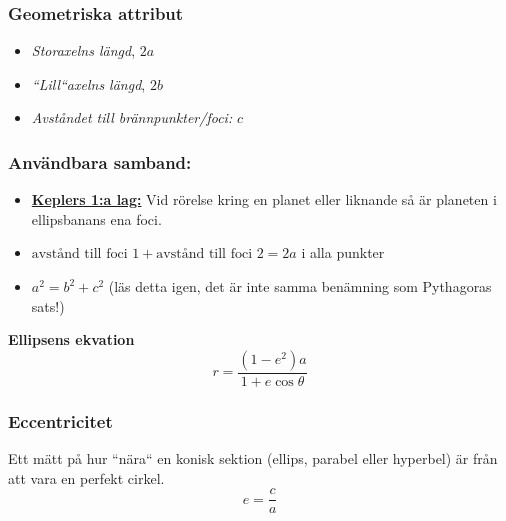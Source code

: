 \documentclass{article}
\newenvironment{ankiflashcard}[1]{}{}
\begin{document}
\begin{paracol}{2}
\begin{ankiflashcard}{Hur benämns de olika sträckorna i ellipsen}
    
\subsubsection{Geometriska attribut}
\begin{itemize}
    \item \textit{Storaxelns längd}, $2a$
    \item  \textit{``Lill``axelns längd}, $2b$
    \item \textit{Avståndet till brännpunkter/foci:} $c$
\end{itemize}
\end{ankiflashcard}


\begin{ankiflashcard}{Ställ upp användbara samband kring ellipsens geometri.}
\subsubsection{Användbara samband:}
\begin{itemize}
    \item \underline{\textbf{Keplers 1:a lag:}} Vid rörelse kring en planet eller liknande så är planeten i ellipsbanans ena foci.
    \item $\text{avstånd till foci 1}+\text{avstånd till foci 2} = 2a$ i alla punkter
    \item $a^2=b^2+c^2$ (läs detta igen, det är inte samma benämning som Pythagoras sats!)
\end{itemize}
\end{ankiflashcard}

\begin{ankiflashcard}{Ställ upp ellipsens ekvation (som funktion av vinkeln)}
\textbf{Ellipsens ekvation}
$$
r=\frac{(1-e^2)a}{1+e\cos \theta}
$$
\end{ankiflashcard}

\begin{ankiflashcard}{Formulera eccentricitet.}
    
\subsubsection{Eccentricitet}
Ett mätt på hur ``nära`` en konisk sektion (ellips, parabel eller hyperbel) är från att vara en perfekt cirkel.
$$e=\frac{c}{a}$$
\end{ankiflashcard}



\end{paracol}
\end{document}
